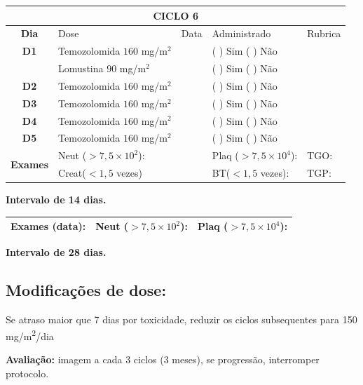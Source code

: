 \documentclass[11pt,a4paper,oldfontcommands]{memoir}
\begin{document}
\begin{center}
\begin{longtable}{p{1cm}p{4cm}|p{1cm}|p{4.6cm}|p{3cm}}
	\hline
	\multicolumn{5}{c}{\textbf{CICLO 6}}\\
\hline
    \multicolumn{1}{c|}{\multirow{1}{*}{\textbf{Dia}}}&{Dose}&{Data}&{Administrado}&{Rubrica} \\
    \hline
    \multicolumn{1}{c|}{\multirow{1}{*}{\textbf{D1}}}&{Temozolomida \(160\) mg/m\(^2\)}&&{(  ) Sim (  ) Não}&\\
    \multicolumn{1}{c|}{\multirow{1}{*}{\textbf{}}}&{Lomustina \(90\) mg/m\(^2\)}&&{(  ) Sim (  ) Não}&\\
    \multicolumn{1}{c|}{\multirow{1}{*}{\textbf{D2}}}&{Temozolomida \(160\) mg/m\(^2\)}&&{(  ) Sim (  ) Não}&\\
    \multicolumn{1}{c|}{\multirow{1}{*}{\textbf{D3}}}&{Temozolomida \(160\) mg/m\(^2\)}&&{(  ) Sim (  ) Não}&\\
    \multicolumn{1}{c|}{\multirow{1}{*}{\textbf{D4}}}&{Temozolomida \(160\) mg/m\(^2\)}&&{(  ) Sim (  ) Não}&\\
    \multicolumn{1}{c|}{\multirow{1}{*}{\textbf{D5}}}&{Temozolomida \(160\) mg/m\(^2\)}&&{(  ) Sim (  ) Não}&\\
    \hline
    \multicolumn{1}{c|}{\multirow{2}{*}{\textbf{Exames}}}&\multicolumn{2}{l|}{Neut (\(>7,5\times10^2\)):}&{Plaq (\(>7,5\times10^4\)):}&{TGO:}\\
    \cline{2-5}
    \multicolumn{1}{c|}{\multirow{2}{*}{{}}}&\multicolumn{2}{l|}{Creat(\(<1,5\) vezes)}&{BT(\(<1,5\) vezes):}&{TGP:}
    \\
    \hline
\end{longtable}
\textbf{Intervalo de 14 dias.}
\begin{longtable}{p{5cm}|p{5cm}|p{4.5cm}}
    \hline
    \textbf{Exames (data):}&{Neut (\(>7,5\times10^2\)):}&{Plaq (\(>7,5\times10^4\)):}
    \\
    \hline
\end{longtable}
\textbf{Intervalo de 28 dias.}
\\[1.5cm]
\end{center}
\clearpage


\subsection{Modificações de dose:}
Se atraso maior que 7 dias por toxicidade, reduzir os ciclos subsequentes para 150 mg/m\textsuperscript{2}/dia

\textbf{Avaliação:} imagem a cada 3 ciclos (3 meses), se progressão, interromper protocolo.
\end{document}
